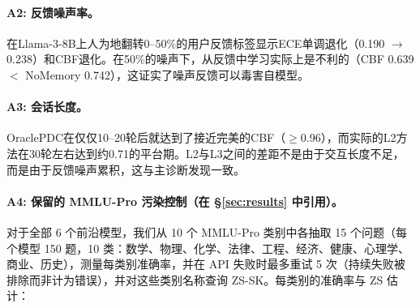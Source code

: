 \documentclass[11pt,a4paper,fontset=fandol]{ctexart}
\begin{document}
\paragraph{A2: 反馈噪声率。}
在Llama-3-8B上人为地翻转0--50\%的用户反馈标签显示ECE单调退化（0.190 $\to$ 0.238）和CBF退化。在50\%的噪声下，从反馈中学习实际上是不利的（CBF 0.639 $<$ NoMemory 0.742），这证实了噪声反馈可以毒害自模型。

\paragraph{A3: 会话长度。}
OraclePDC在仅仅10--20轮后就达到了接近完美的CBF（$\geq$0.96），而实际的L2方法在30轮左右达到约0.71的平台期。L2与L3之间的差距不是由于交互长度不足，而是由于反馈噪声累积，这与主诊断发现一致。

\paragraph{A4: 保留的 MMLU-Pro 污染控制（在 \S\ref{sec:results} 中引用）。}
\label{app:heldout}
对于全部 6 个前沿模型，我们从 10 个 MMLU-Pro 类别中各抽取 15 个问题（每个模型 150 题，10 类：数学、物理、化学、法律、工程、经济、健康、心理学、商业、历史），测量每类别准确率，并在 API 失败时最多重试 5 次（持续失败被排除而非计为错误），并对这些类别名称查询 ZS-SK。每类别的准确率与 ZS 估计：
\end{document}
